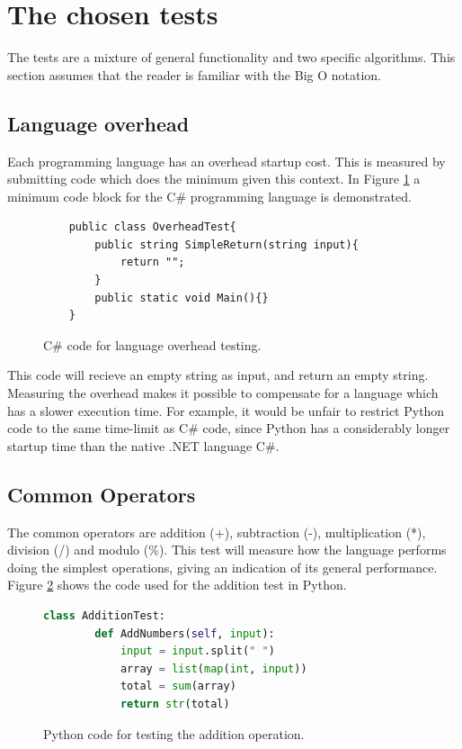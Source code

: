 \section{The chosen tests}
The tests are a mixture of general functionality and two specific algorithms. This section assumes that the reader is familiar with the Big O notation.

\subsection{Language overhead}
Each programming language has an overhead startup cost. This is measured by submitting code which does the minimum given this context. In Figure \ref{fig:language_overhead} a minimum code block for the C\# programming language is demonstrated.

\begin{figure}[h]
	\lstset{style=sharpc}
	\begin{lstlisting}
	public class OverheadTest{
		public string SimpleReturn(string input){
			return "";
		}
		public static void Main(){}
	}
	\end{lstlisting}
	\caption{C\# code for language overhead testing.}
	\label{fig:language_overhead}
\end{figure}

This code will recieve an empty string as input, and return an empty string. Measuring the overhead makes it possible to compensate for a language which has a slower execution time. For example, it would be unfair to restrict Python code to the same time-limit as C\# code, since Python has a considerably longer startup time than the native .NET language C\#. 

\subsection{Common Operators}
The common operators are addition (+), subtraction (-), multiplication (*), division (/) and modulo (\%). This test will measure how the language performs doing the simplest operations, giving an indication of its general performance. Figure \ref{fig:addition_test} shows the code used for the addition test in Python.

\begin{figure}[h]
	\lstset{style=sharpc}
	\begin{lstlisting}[language=python]
	class AdditionTest:
	    def AddNumbers(self, input):
	        input = input.split(" ")
	        array = list(map(int, input))
	        total = sum(array)
	        return str(total)
	\end{lstlisting}
	\caption{Python code for testing the addition operation.}
	\label{fig:addition_test}
\end{figure}

